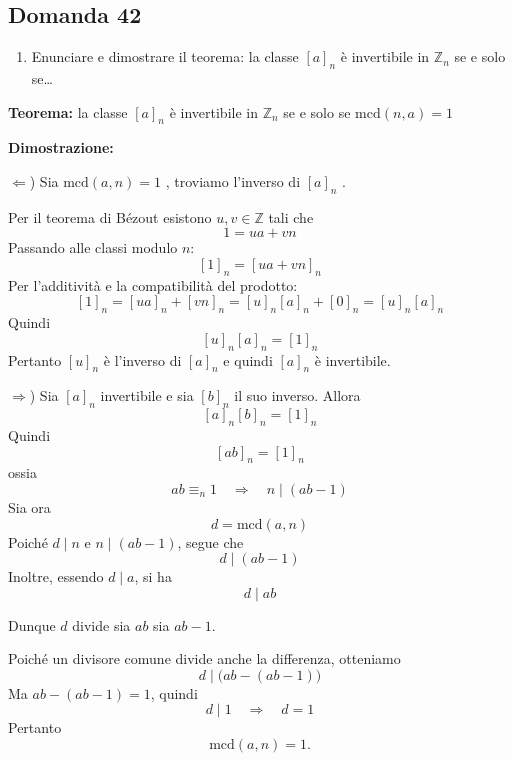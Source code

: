\documentclass[
  a4paper,
]{article}
\providecommand{\tightlist}{%
  \setlength{\itemsep}{0pt}\setlength{\parskip}{0pt}}
\providecommand{\tightlist}{}
\begin{document}
\hypertarget{domanda-42}{%
\subsection{Domanda 42}\label{domanda-42}}

\begin{observationbox}[Domanda]
\begin{enumerate}
\def\labelenumi{\arabic{enumi}.}
\setcounter{enumi}{41}
\tightlist
\item
  Enunciare e dimostrare il teorema: la classe \([a]_n\) è invertibile
  in \(\mathbb{Z}_n\) se e solo se\ldots{}
\end{enumerate}
\end{observationbox}

\textbf{Teorema:} la classe \([a]_n\) è invertibile in \(\mathbb{Z}_n\)
se e solo se \(\text{mcd}(n, a) = 1\)

\textbf{Dimostrazione:}

\(\Leftarrow\)) Sia \(\text{mcd}(a,n)=1\) , troviamo l'inverso di
\([a]_n\) .

Per il teorema di Bézout esistono \(u,v\in\mathbb Z\) tali che \[
1 = ua + vn
\] Passando alle classi modulo \(n\): \[
[1]_n = [ua+vn]_n
\] Per l'additività e la compatibilità del prodotto: \[
[1]_n
=
[ua]_n + [vn]_n
=
[u]_n[a]_n + [0]_n
=
[u]_n[a]_n
\] Quindi \[
[u]_n[a]_n=[1]_n
\] Pertanto \([u]_n\) è l'inverso di \([a]_n\) e quindi \([a]_n\) è
invertibile.

\bigskip

\(\Rightarrow\)) Sia \([a]_n\) invertibile e sia \([b]_n\) il suo
inverso. Allora \[
[a]_n[b]_n=[1]_n
\] Quindi \[
[ab]_n=[1]_n
\] ossia \[
ab \equiv_n 1 \quad \Longrightarrow \quad n \mid (ab-1)
\] Sia ora \[
d=\text{mcd}(a,n)
\] Poiché \(d\mid n\) e \(n\mid(ab-1)\), segue che \[
d\mid(ab-1)
\] Inoltre, essendo \(d\mid a\), si ha \[
d\mid ab
\]

Dunque \(d\) divide sia \(ab\) sia \(ab-1\).

Poiché un divisore comune divide anche la differenza, otteniamo \[
d \mid \bigl(ab-(ab-1)\bigr)
\] Ma \(ab-(ab-1)=1\), quindi \[
d\mid 1 \quad \Longrightarrow \quad d = 1
\] Pertanto \[
\text{mcd}(a,n)=1.
\]
\end{document}
